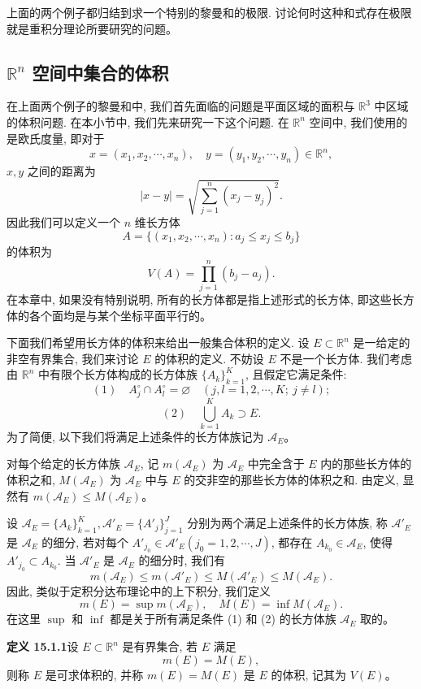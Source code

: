 \documentclass[UTF8,12pt,a4paper,fontset=fandol]{ctexart}
\begin{document}
上面的两个例子都归结到求一个特别的黎曼和的极限. 讨论何时这种和式存在极限就是重积分理论所要研究的问题。

\subsection{$\mathbb R^n$ 空间中集合的体积}

在上面两个例子的黎曼和中, 我们首先面临的问题是平面区域的面积与 $\mathbb R^3$ 中区域的体积问题. 在本小节中, 我们先来研究一下这个问题. 在 $\mathbb R^n$ 空间中, 我们使用的是欧氏度量, 即对于
\[
  x=(x_1,x_2,\cdots,x_n),\quad y=(y_1,y_2,\cdots,y_n)\in\mathbb R^n,
\]
$x,y$ 之间的距离为
\[
  |x-y|=\sqrt{\sum_{j=1}^n(x_j-y_j)^2}.
\]
因此我们可以定义一个 $n$ 维长方体
\[
  A=\{(x_1,x_2,\cdots,x_n):a_j\leqslant x_j\leqslant b_j\}
\]
的体积为
\[
  V(A)=\prod_{j=1}^n(b_j-a_j).
\]
在本章中, 如果没有特别说明, 所有的长方体都是指上述形式的长方体, 即这些长方体的各个面均是与某个坐标平面平行的。

下面我们希望用长方体的体积来给出一般集合体积的定义. 设 $E\subset\mathbb R^n$ 是一给定的非空有界集合, 我们来讨论 $E$ 的体积的定义. 不妨设 $E$ 不是一个长方体. 我们考虑由 $\mathbb R^n$ 中有限个长方体构成的长方体族 $\{A_k\}_{k=1}^K$, 且假定它满足条件:
\[
  (1)\quad A_j^\circ\cap A_l^\circ=\varnothing\quad (j,l=1,2,\cdots,K;\ j\ne l);
\]
\[
  (2)\quad \bigcup_{k=1}^K A_k\supset E.
\]
为了简便, 以下我们将满足上述条件的长方体族记为 $\mathcal A_E$。

对每个给定的长方体族 $\mathcal A_E$, 记 $m(\mathcal A_E)$ 为 $\mathcal A_E$ 中完全含于 $E$ 内的那些长方体的体积之和, $M(\mathcal A_E)$ 为 $\mathcal A_E$ 中与 $E$ 的交非空的那些长方体的体积之和. 由定义, 显然有 $m(\mathcal A_E)\leqslant M(\mathcal A_E)$。

设 $\mathcal A_E=\{A_k\}_{k=1}^K,\mathcal A'_E=\{A'_j\}_{j=1}^J$ 分别为两个满足上述条件的长方体族, 称 $\mathcal A'_E$ 是 $\mathcal A_E$ 的细分, 若对每个 $A'_{j_0}\in\mathcal A'_E(j_0=1,2,\cdots,J)$, 都存在 $A_{k_0}\in\mathcal A_E$, 使得 $A'_{j_0}\subset A_{k_0}$. 当 $\mathcal A'_E$ 是 $\mathcal A_E$ 的细分时, 我们有
\[
  m(\mathcal A_E)\leqslant m(\mathcal A'_E)\leqslant M(\mathcal A'_E)\leqslant M(\mathcal A_E).
\]
因此, 类似于定积分达布理论中的上下积分, 我们定义
\[
  m(E)=\sup m(\mathcal A_E),\quad M(E)=\inf M(\mathcal A_E).
\]
在这里 $\sup$ 和 $\inf$ 都是关于所有满足条件 (1) 和 (2) 的长方体族 $\mathcal A_E$ 取的。

\noindent\textbf{定义 15.1.1}\quad 设 $E\subset\mathbb R^n$ 是有界集合, 若 $E$ 满足
\[
  m(E)=M(E),
\]
则称 $E$ 是可求体积的, 并称 $m(E)=M(E)$ 是 $E$ 的体积, 记其为 $V(E)$。
\end{document}
